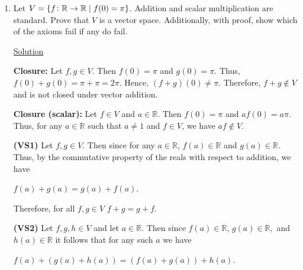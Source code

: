 \documentclass[12pt, a4paper]{article}
\begin{document}
\begin{enumerate}
    \item Let $V=\{f\colon\mathbb{R}\rightarrow\mathbb{R}\hspace{1mm}|\hspace{1mm}f(0)=\pi\}$. Addition and scalar multiplication are standard. Prove that $V$ is a vector space. Additionally, with proof, show which of the axioms fail if any do fail.
    
    \vspace{4mm}
    
    \underline{Solution}\par
    
    \vspace{4mm}
    
    \textbf{Closure: }Let $f,g\in V$. Then $f(0)=\pi$ and $g(0)=\pi$. Thus, $f(0)+g(0)=\pi+\pi=2\pi$. Hence, $(f+g)(0)\neq\pi$. Therefore, $f+g\notin V$ and is not closed under vector addition.
    
    \vspace{4mm}
    
    \textbf{Closure (scalar): }Let $f\in V$ and $a\in\mathbb{R}$. Then $f(0)=\pi$ and $af(0)=a\pi$. Thus, for any $a\in\mathbb{R}$ such that $a\neq 1$ and $f\in V$, we have $af\notin V$.
    
    \vspace{4mm}
    
    \textbf{(VS1) }Let $f,g\in V$. Then since for any $a\in\mathbb{R}$, $f(a)\in\mathbb{R}$ and $g(a)\in\mathbb{R}$. Thus, by the commutative property of the reals with respect to addition, we have\par
    
    \vspace{2mm}
    
    \centerline{$f(a)+g(a)=g(a)+f(a)$.}
    
    \vspace{2mm}
    
    Therefore, for all $f,g\in V$ $f+g=g+f$.
    
    \vspace{4mm}
    
    \textbf{(VS2) }Let $f,g,h\in V$ and let $a\in\mathbb{R}$. Then since $f(a)\in\mathbb{R}$, $g(a)\in\mathbb{R},$ and $h(a)\in\mathbb{R}$ it follows that for any such $a$ we have\par
    
    \vspace{2mm}
    
    \centerline{$f(a)+(g(a)+h(a))=(f(a)+g(a))+h(a)$.}
    

\end{enumerate}
\end{document}

